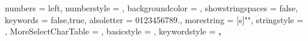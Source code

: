 




\usepackage[backend=biber]{biblatex} 


\usepackage{graphicx}
\usepackage{svg}
\usepackage{wrapfig}
\usepackage{lscape}

\usepackage[hidelinks]{hyperref}

\usepackage{xcolor}
\usepackage{listings}

\newcommand\JSONnumbervaluestyle{\color{blue}}
\newcommand\JSONstringvaluestyle{\color{red}}

\newif\ifcolonfoundonthisline

\makeatletter

{
	numbers             = left,
	numberstyle         = \scriptsize,
	backgroundcolor     = \color{background},
	showstringspaces    = false,
	keywords            = {false,true},
	alsoletter          = 0123456789.,
	morestring          = [s]{"}{"},
	stringstyle         = \ifcolonfoundonthisline\JSONstringvaluestyle\fi,
	MoreSelectCharTable =%
	\colon@json{\processColon@json},
	basicstyle          = \ttfamily,
	keywordstyle        = \ttfamily\bfseries,
}

\newcommand\processColon@json{%
	\colon@json%
	\ifnum\lst@mode=\lst@Pmode%
	\global\colonfoundonthislinetrue%
	\fi
}

\lst@AddToHook{Output}{%
	\ifcolonfoundonthisline%
	\ifnum\lst@mode=\lst@Pmode%
	\def\lst@thestyle{\JSONnumbervaluestyle}%
	\fi
	\fi
	\lsthk@DetectKeywords%
}

%
{\global\colonfoundonthislinefalse}


